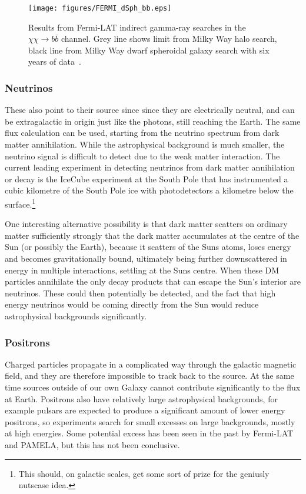 \documentclass[notes.tex]{subfiles}
\begin{document}
\begin{figure}[t!]
\begin{center}
\texttt{[image: figures/FERMI\_dSph\_bb.eps]} 
\caption[Fermi-LAT results]{Results from Fermi-LAT indirect gamma-ray searches in the $\chi\chi\to b\bar b$ channel. Grey line shows limit from Milky Way halo search, black line from Milky Way dwarf spheroidal galaxy search with six years of data~\cite{Ackermann:2015zua}. \label{fig:FERMI}}
\end{center}
\end{figure}

%
\subsubsection{Neutrinos} 
These also point to their source since since they are electrically neutral, and can be extragalactic in origin just like the photons, still reaching the Earth. The same flux calculation can be used, starting from the neutrino spectrum from dark matter annihilation. While the astrophysical background is much smaller, the neutrino signal is difficult to detect due to the weak matter interaction. The current leading experiment in detecting neutrinos from dark matter annihilation or decay is the IceCube experiment at the South Pole that has instrumented a cubic kilometre of the South Pole ice with photodetectors a kilometre below the surface.\footnote{This should, on galactic scales, get some sort of prize for the geniusly nutscase idea.} 

One interesting alternative possibility is that dark matter scatters on ordinary matter sufficiently strongly that the dark matter accumulates at the centre of the Sun (or possibly the Earth), because it scatters of the Suns atoms, loses energy and becomes gravitationally bound, ultimately being further downscattered in energy in multiple interactions, settling at the Suns centre. When these DM particles annihilate the only decay products that can escape the Sun's interior are neutrinos. These could then potentially be detected, and the fact that high energy neutrinos would be coming directly from the Sun would reduce astrophysical backgrounds significantly.

%
\subsubsection{Positrons} 
Charged particles propagate in a complicated way through the galactic magnetic field, and they are therefore impossible to track back to the source. At the same time sources outside of our own Galaxy cannot contribute significantly to the flux at Earth. 
Positrons also have relatively  large astrophysical backgrounds, for example pulsars are expected to produce a significant amount of lower energy positrons,  so experiments search for small excesses on large backgrounds, mostly at high energies. Some potential excess has been seen in the past by Fermi-LAT and PAMELA, but this has not been conclusive.
\end{document}
